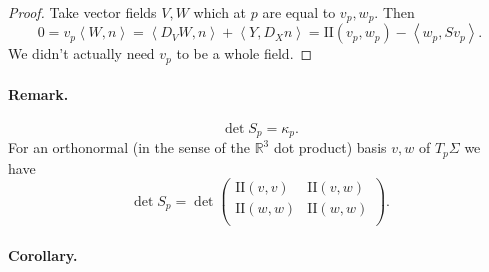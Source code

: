 \begin{proof}
Take vector fields \( V, W \) which at \( p \) are equal to \( v_p, w_p \). Then
\[ 
    0 = v_p \left\langle W, n \right\rangle = \left\langle D_V W, n \right\rangle + \left\langle Y , D_X n \right\rangle = \mathrm{I\!I}(v_p, w_p) - \left\langle w_p, Sv_p \right\rangle.
\]
We didn't actually need \( v_p \) to be a whole field.
\end{proof}


\paragraph{Remark.}
\[ 
    \det S_p = \kappa_p. 
\]
For an orthonormal (in the sense of the \( \mathbb{R}^3 \) dot product) basis \( v, w \) of \( T_p \Sigma \) we have
\[ 
    \det S_p = \det \begin{pmatrix}
    \mathrm{I\!I}(v, v) & \mathrm{I\!I} (v, w) \\
    \mathrm{I\!I}(w, w) & \mathrm{I\!I} (w, w) \\
    \end{pmatrix}.
\]


\paragraph{Corollary.} 
